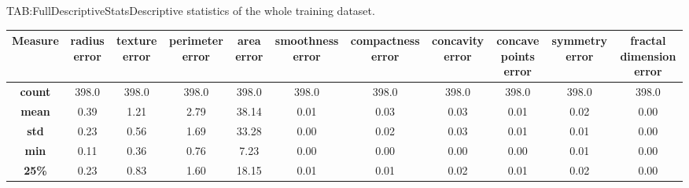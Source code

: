 \begin{landscape}
\begin{table}[Complete Descriptive Statistics]{TAB:FullDescriptiveStats}{Descriptive statistics of the whole training dataset.}
        \begin{adjustbox}{width=1\linewidth}
            \begin{tabular}{|c|*{10}{c|}}
                \hline
                \textbf{Measure} & \textbf{\bfseries radius error} & \textbf{\bfseries texture error} & \textbf{\bfseries perimeter error} & \textbf{\bfseries area error} & \textbf{\bfseries smoothness error} & \textbf{\bfseries compactness error} & \textbf{\bfseries concavity error} & \textbf{\bfseries concave points error} & \textbf{\bfseries symmetry error} & \textbf{\bfseries fractal dimension error} \\
                \hline\hline
                \textbf{count}   & 398.0                           & 398.0                            & 398.0                              & 398.0                         & 398.0                               & 398.0                                & 398.0                              & 398.0                                   & 398.0                             & 398.0                                      \\
                \hline
                \textbf{mean}    & 0.39                            & 1.21                             & 2.79                               & 38.14                         & 0.01                                & 0.03                                 & 0.03                               & 0.01                                    & 0.02                              & 0.00                                       \\
                \hline
                \textbf{std}     & 0.23                            & 0.56                             & 1.69                               & 33.28                         & 0.00                                & 0.02                                 & 0.03                               & 0.01                                    & 0.01                              & 0.00                                       \\
                \hline
                \textbf{min}     & 0.11                            & 0.36                             & 0.76                               & 7.23                          & 0.00                                & 0.00                                 & 0.00                               & 0.00                                    & 0.01                              & 0.00                                       \\
                \hline
                \textbf{25\%}    & 0.23                            & 0.83                             & 1.60                               & 18.15                         & 0.01                                & 0.01                                 & 0.02                               & 0.01                                    & 0.02                              & 0.00                                       \\

\end{tabular}
\end{adjustbox}
\end{table}
\end{landscape}
